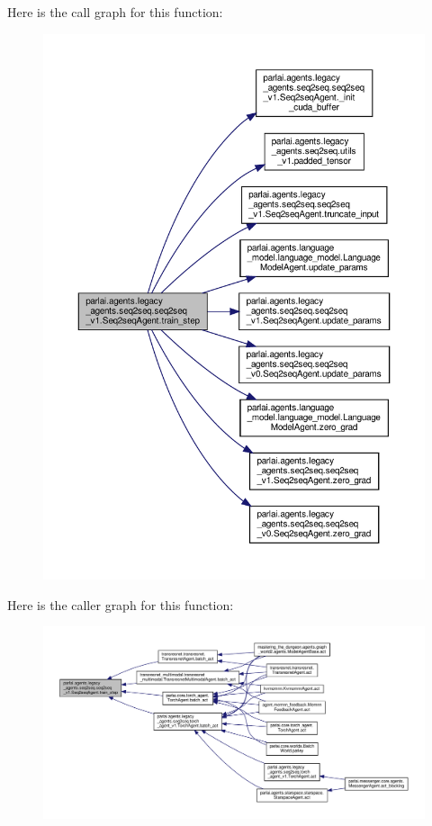 Here is the call graph for this function\+:
\nopagebreak
\begin{figure}[H]
\begin{center}
\leavevmode
\includegraphics[width=350pt]{classparlai_1_1agents_1_1legacy__agents_1_1seq2seq_1_1seq2seq__v1_1_1Seq2seqAgent_a59a524e15577396e60a1e5f8b6bfe9a7_cgraph}
\end{center}
\end{figure}
Here is the caller graph for this function\+:
\nopagebreak
\begin{figure}[H]
\begin{center}
\leavevmode
\includegraphics[width=350pt]{classparlai_1_1agents_1_1legacy__agents_1_1seq2seq_1_1seq2seq__v1_1_1Seq2seqAgent_a59a524e15577396e60a1e5f8b6bfe9a7_icgraph}
\end{center}
\end{figure}
